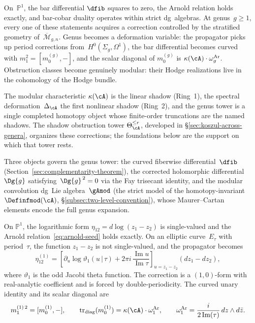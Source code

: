 \smallskip
On~$\mathbb{P}^1$, the bar differential $\dfib$ squares to zero, the
Arnold relation holds exactly, and bar-cobar duality operates
within strict dg~algebras. At genus~$g \geq 1$, every one
of these statements acquires a correction controlled by the stratified
geometry of~$\overline{\mathcal{M}}_{g,n}$. Genus becomes a deformation
variable: the propagator picks up period corrections
from~$H^0(\Sigma_g, \Omega^1)$, the bar differential becomes curved
with $m_1^2=[m_0^{(g)},-]$, and the scalar diagonal of $m_0^{(g)}$
is $\kappa(\cA)\cdot\omega_g^{\mathrm{Ar}}$. Obstruction classes
become genuinely modular: their Hodge realizations live in the
cohomology of the Hodge bundle.

The modular characteristic
$\kappa(\cA)$ is the linear shadow (Ring~1), the spectral
deformation~$\Delta_{\cA}$ the first nonlinear shadow (Ring~2),
and the genus tower is a single completed homotopy object whose
finite-order truncations are the named shadows. The shadow obstruction tower
$\Theta_{\cA}^{\leq r}$, developed in
\S\ref{sec:koszul-across-genera}, organizes these corrections; the
foundations below are the support on which that tower rests.

Three objects govern the genus tower: the curved fiberwise
differential~$\dfib$ (Section~\ref{sec:complementarity-theorem}), the
corrected holomorphic differential~$\Dg{g}$ satisfying~$\Dg{g}^{\,2}=0$
via the Fay trisecant identity, and the modular convolution dg~Lie
algebra~$\gAmod$ (the strict model of the homotopy-invariant
$\Definfmod(\cA)$,
\S\ref{subsec:two-level-convention}), whose Maurer--Cartan
elements encode the full genus expansion.

On $\mathbb{P}^1$, the logarithmic form
$\eta_{12} = d\log(z_1 - z_2)$ is single-valued and the Arnold
relation~\eqref{eq:arnold-seed} holds exactly. On an elliptic
curve~$E_\tau$ with period~$\tau$, the function $z_1 - z_2$ is not
single-valued, and the propagator becomes
\begin{equation}\label{eq:elliptic-propagator}
\eta_{12}^{(1)}
=
\left[
\partial_u\log \vartheta_1(u\,|\,\tau)
+2\pi i\,\frac{\operatorname{Im}u}{\operatorname{Im}\tau}
\right]_{u=z_1-z_2}
(dz_1-dz_2),
\end{equation}
where $\vartheta_1$ is the odd Jacobi theta function. The correction
is a $(1,0)$-form with real-analytic coefficient and is forced by
double-periodicity.  The curved unary identity and its scalar diagonal
are
\begin{equation}\label{eq:curvature-visible}
m_1^{(1)\,2}=[m_0^{(1)},-],\qquad
\operatorname{tr}_{\mathrm{diag}}(m_0^{(1)})
= \kappa(\cA) \cdot \omega_1^{\mathrm{Ar}}, \qquad
\omega_1^{\mathrm{Ar}} = \frac{i}{2\operatorname{Im}(\tau)}\,
dz \wedge d\bar{z}.
\end{equation}

